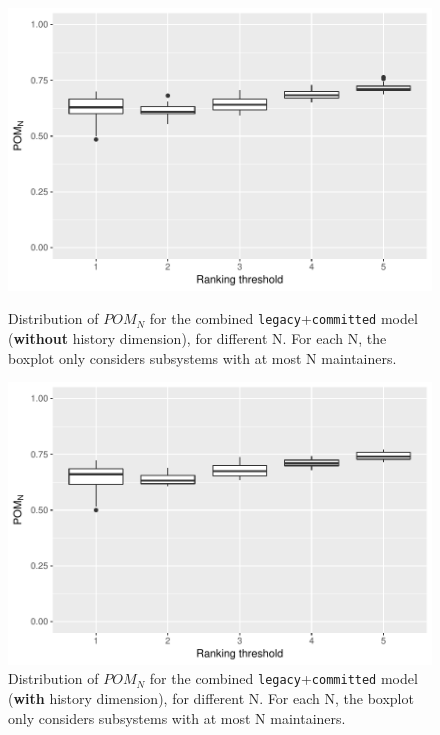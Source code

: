 \begin{figure}[t]
  \centering
  \begin{minipage}[b]{\columnwidth}
    \centering
    \includegraphics[scale=.5]{plots/RQ3_curr_many}
    \caption{Distribution of $POM_N$ for the combined \texttt{legacy}+\texttt{committed} model (\textbf{without} history dimension), for different N. For each N, the boxplot only considers subsystems with at most N maintainers.}
    \label{fig:rq3_curr_many}
  \end{minipage}
  \begin{minipage}[b]{\columnwidth}
    \centering
    \includegraphics[scale=.5]{plots/RQ3_hist_many}
    \caption{Distribution of $POM_N$ for the combined \texttt{legacy}+\texttt{committed} model (\textbf{with} history dimension), for different N. For each N, the boxplot only considers subsystems with at most N maintainers.}
    \label{fig:rq3_hist_many}
  \end{minipage}
\end{figure}



